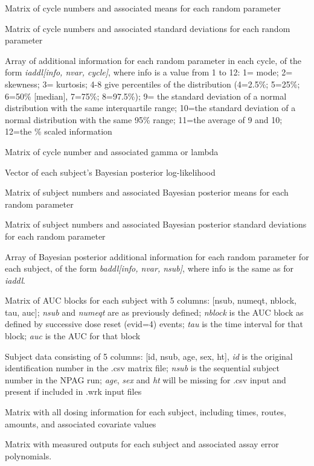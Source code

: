 \documentclass[a4paper]{book}
\begin{document}
\begin{Value}
\begin{ldescription}
\item[\code{imean }] Matrix of cycle numbers and associated means for each random parameter
\item[\code{isd }] Matrix of cycle numbers and associated standard deviations for each random parameter
\item[\code{iaddl }] Array of additional information for each random parameter in each cycle,
of the form \emph{iaddl[info, nvar, cycle]},  where info is a value from 1 to 12:
1= mode; 2= skewness; 3= kurtosis; 4-8 give percentiles of the distribution (4=2.5\%; 5=25\%;
6=50\% [median],  7=75\%; 8=97.5\%); 9= the standard deviation of a normal distribution
with the same interquartile range; 10=the standard deviation of a normal distribution
with the same 95\% range; 11=the average of 9 and 10; 12=the \% scaled information
\item[\code{igamlam }] Matrix of cycle number and associated gamma or lambda
\item[\code{blog }] Vector of each subject's Bayesian posterior log-likelihood
\item[\code{bmean }] Matrix of subject numbers and associated Bayesian posterior means for each random parameter
\item[\code{bsd }] Matrix of subject numbers and associated Bayesian posterior standard deviations for each random parameter
\item[\code{baddl }] Array of Bayesian posterior additional information for each random parameter
for each subject, of the form \emph{baddl[info, nvar, nsub]},  where info is the same as for \emph{iaddl}.
\item[\code{bauc }] Matrix of AUC blocks for each subject with 5 columns:
[nsub,  numeqt,  nblock,  tau,  auc]; \emph{nsub} and \emph{numeqt} are as previously defined;
\emph{nblock} is the AUC block as defined by successive dose reset (evid=4) events;
\emph{tau} is the time interval for that block; \emph{auc} is the AUC for that block
\item[\code{sdata }] Subject data consisting of 5 columns: [id,  nsub,  age,  sex,  ht],
\emph{id} is the original identification number in the .csv matrix file;
\emph{nsub} is the sequential subject number in the NPAG run; \emph{age},
\emph{sex} and \emph{ht} will be missing for .csv input and present if included in .wrk input files
\item[\code{dosecov }] Matrix with all dosing information for each subject,  including times,  routes,  amounts,  and associated covariate values
\item[\code{outputs }] Matrix with measured outputs for each subject and associated assay error polynomials.

\end{ldescription}
\end{Value}
\end{document}
